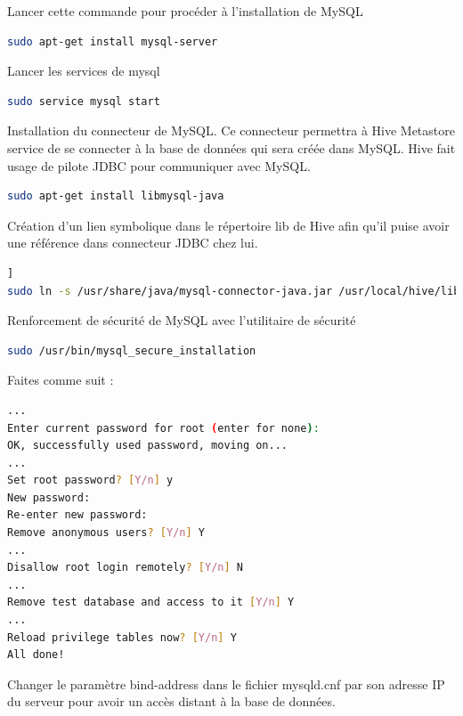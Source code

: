 \documentclass[12pt,english]{book}
\begin{document}
Lancer cette commande pour procéder à l’installation de MySQL

\begin{lstlisting}[language=bash, frame=single]
sudo apt-get install mysql-server
\end{lstlisting}

Lancer les services de mysql

\begin{lstlisting}[language=bash, frame=single]
sudo service mysql start
\end{lstlisting}

Installation du connecteur de MySQL.
Ce connecteur permettra à Hive Metastore service de se connecter à la base de données qui sera créée dans MySQL.
Hive fait usage de pilote JDBC pour communiquer avec MySQL.

\begin{lstlisting}[language=bash, frame=single]
sudo apt-get install libmysql-java
\end{lstlisting}

Création d’un lien symbolique dans le répertoire lib de Hive afin qu’il puise avoir une référence dans connecteur JDBC chez lui.

\begin{lstlisting}[language=bash, frame=single, breaklines=true, postbreak=\mbox{\textcolor{red}{$\hookrightarrow$}\space}]]
sudo ln -s /usr/share/java/mysql-connector-java.jar /usr/local/hive/lib/mysql-connector-java.jar
\end{lstlisting}

Renforcement de sécurité de MySQL avec l’utilitaire de sécurité

\begin{lstlisting}[language=bash, frame=single]
sudo /usr/bin/mysql_secure_installation
\end{lstlisting}

Faites comme suit :

\begin{lstlisting}[language=bash, frame=single]
...
Enter current password for root (enter for none):
OK, successfully used password, moving on...
...
Set root password? [Y/n] y
New password:
Re-enter new password:
Remove anonymous users? [Y/n] Y
...
Disallow root login remotely? [Y/n] N
...
Remove test database and access to it [Y/n] Y
...
Reload privilege tables now? [Y/n] Y
All done!
\end{lstlisting}

Changer le paramètre bind-address dans le fichier mysqld.cnf par son adresse IP du serveur pour avoir un accès distant à la base de données.
\end{document}
